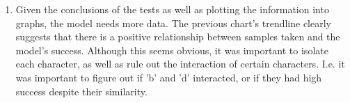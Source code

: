 \documentclass[12pt]{article} %
\begin{document}
\begin{enumerate}[label = (\roman*)]
\item Given the conclusions of the tests as well as plotting the information into graphs, the model needs more data. The previous chart's trendline clearly suggests that there is a positive relationship between samples taken and the model's success. Although this seems obvious, it was important to isolate each character, as well as rule out the interaction of certain characters. I.e. it was important to figure out if 'b' and 'd' interacted, or if they had high success despite their similarity.
\end{enumerate}
\end{document}
